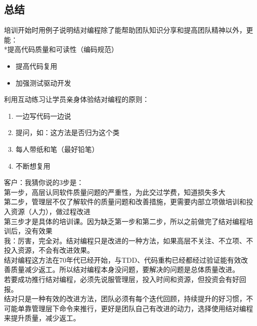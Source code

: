 \hypertarget{ux603bux7ed3}{%
\subsection{总结}\label{ux603bux7ed3}}

培训开始时用例子说明结对编程除了能帮助团队知识分享和提高团队精神以外，更能：\\
*提高代码质量和可读性（编码规范）

\begin{itemize}
\tightlist
\item
  提高代码复用
\item
  加强测试驱动开发\\
\end{itemize}

利用互动练习让学员亲身体验结对编程的原则：

\begin{enumerate}
\tightlist
\item
  一边写代码一边说
\item
  提问，如：这方法是否归为这个类
\item
  每人带纸和笔（最好铅笔）
\item
  不断想复用
\end{enumerate}

\begin{description}
\item[]
\begin{description}
\tightlist
\item[]
-\/-\/- *** === *** -\/-\/-\\
\end{description}
\end{description}

客户：我猜你说的3步是：\\
第一步，高层认同软件质量问题的严重性，为此交过学费，知道损失多大\\
第二步，管理层不仅了解软件的质量问题和改善措施，更需要内部立项做培训和投入资源（人力），做过程改进\\
第三步才是具体的培训课。因为缺乏第一步和第二步，所以之前做完了结对编程培训后，没有效果\\
我：厉害，完全对。结对编程只是改进的一种方法，如果高层不关注、不立项、不投入资源，不会有改进效果。\\
结对编程这方法在70年代已经开始，与TDD、代码重构已经都经过验证能有效改善质量减少返工。所以结对编程本身没问题，要解决的问题是总体质量改进。\\
若要成功推行结对编程，必须先说服管理层，投入时间和资源，但投资会有好回报。\\
结对只是一种有效的改进方法，团队必须有每个迭代回顾，持续提升的好习惯，不可能单靠管理层下命令来推行，更好是团队自己有改进的动力，选择使用结对编程来提升质量，减少返工。


